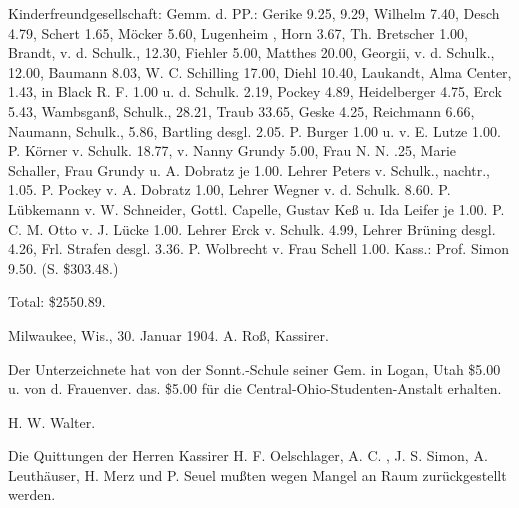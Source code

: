 Kinderfreundgesellschaft: Gemm. d. PP.: Gerike 9.25,  9.29, Wilhelm 7.40, Desch 4.79, Schert 1.65, Möcker 5.60, Lugenheim , Horn 3.67, Th. Bretscher 1.00, Brandt, v. d. Schulk., 12.30, Fiehler 5.00, Matthes 20.00, Georgii, v. d. Schulk., 12.00, Baumann 8.03, W. C. Schilling 17.00, Diehl 10.40, Laukandt, Alma Center, 1.43, in Black R. F. 1.00 u. d. Schulk. 2.19, Pockey 4.89, Heidelberger 4.75, Erck 5.43, Wambsganß,  Schulk., 28.21, Traub 33.65, Geske 4.25, Reichmann 6.66, Naumann,  Schulk., 5.86, Bartling desgl. 2.05. P. Burger 1.00 u. v. E. Lutze 1.00. P. Körner v. Schulk. 18.77, v. Nanny Grundy 5.00, Frau N. N. .25, Marie Schaller, Frau Grundy u. A. Dobratz je 1.00. Lehrer Peters v. Schulk., nachtr., 1.05. P. Pockey v. A. Dobratz 1.00, Lehrer Wegner v. d. Schulk. 8.60. P. Lübkemann v. W. Schneider, Gottl. Capelle, Gustav Keß u. Ida Leifer je 1.00. P. C. M. Otto v. J. Lücke 1.00. Lehrer Erck v. Schulk. 4.99, Lehrer Brüning desgl. 4.26, Frl. Strafen desgl. 3.36. P. Wolbrecht v. Frau Schell 1.00. Kass.: Prof. Simon 9.50. (S. \$303.48.)

Total: \$2550.89.

Milwaukee, Wis., 30. Januar 1904. A. Roß, Kassirer.

Der Unterzeichnete hat von der Sonnt.-Schule seiner Gem. in Logan, Utah \$5.00 u. von d. Frauenver. das. \$5.00 für die Central-Ohio-Studenten-Anstalt erhalten.

H. W. Walter.

Die Quittungen der Herren Kassirer H. F. Oelschlager, A. C. , J. S. Simon, A. Leuthäuser, H. Merz und P. Seuel mußten wegen Mangel an Raum zurückgestellt werden.
